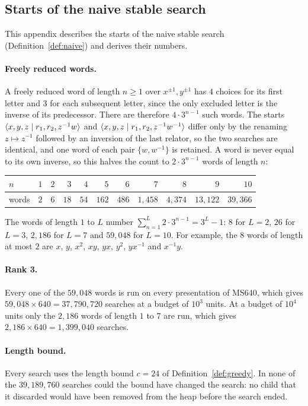 \subsection{Starts of the naive stable search}\label{app:stable}

This appendix describes the starts of the naive stable search (Definition~\ref{def:naive}) and derives their
numbers.

\paragraph{Freely reduced words.} A freely reduced word of length $n\ge1$ over $x^{\pm1},y^{\pm1}$ has $4$ choices for
its first letter and $3$ for each subsequent letter, since the only excluded letter is the inverse of its predecessor.
There are therefore $4\cdot3^{n-1}$ such words. The starts $\langle x,y,z \mid r_1,r_2,z^{-1}w \rangle$ and
$\langle x,y,z \mid r_1,r_2,z^{-1}w^{-1} \rangle$ differ only by the renaming $z\mapsto z^{-1}$ followed by an inversion of the last
relator, so the two searches are identical, and one word of each pair $\{w,w^{-1}\}$ is retained. A word is never equal
to its own inverse, so this halves the count to $2\cdot3^{n-1}$ words of length $n$:
\begin{center}
\small
\begin{tabular}{lrrrrrrrrrr}
\toprule
$n$ & $1$ & $2$ & $3$ & $4$ & $5$ & $6$ & $7$ & $8$ & $9$ & $10$\\
\midrule
words & $2$ & $6$ & $18$ & $54$ & $162$ & $486$ & $1{,}458$ & $4{,}374$ & $13{,}122$ & $39{,}366$\\
\bottomrule
\end{tabular}
\end{center}
The words of length $1$ to $L$ number $\sum_{n=1}^{L}2\cdot3^{n-1}=3^L-1$: $8$ for $L=2$, $26$ for $L=3$, $2{,}186$ for
$L=7$ and $59{,}048$ for $L=10$. For example, the $8$ words of length at most $2$ are $x$, $y$, $x^2$, $xy$, $yx$, $y^2$,
$yx^{-1}$ and $x^{-1}y$.

\paragraph{Rank 3.} Every one of the $59{,}048$ words is run on every presentation of MS640, which gives
$59{,}048\times640=37{,}790{,}720$ searches at a budget of $10^3$ units. At a budget of $10^4$ units only the $2{,}186$
words of length $1$ to $7$ are run, which gives $2{,}186\times640=1{,}399{,}040$ searches.

\paragraph{Length bound.} Every search uses the length bound $c=24$ of Definition~\ref{def:greedy}. In none of the
$39{,}189{,}760$ searches could the bound have changed the search: no child that it discarded would have been removed
from the heap before the search ended.

